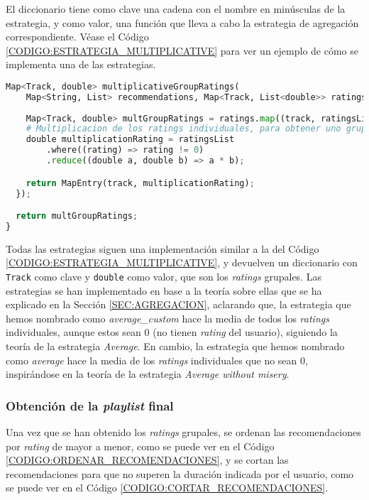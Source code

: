El diccionario tiene como clave una cadena con el nombre en minúsculas de la estrategia, y como valor, 
una función que lleva a cabo la estrategia de agregación correspondiente. Véase el Código \ref{CODIGO:ESTRATEGIA_MULTIPLICATIVE} 
para ver un ejemplo de cómo se implementa una de las estrategias.

\begin{lstlisting}[language=python, caption=Estrategia de agregación \textit{average}, label=CODIGO:ESTRATEGIA_MULTIPLICATIVE]
Map<Track, double> multiplicativeGroupRatings(
    Map<String, List> recommendations, Map<Track, List<double>> ratings) {
  
    Map<Track, double> multGroupRatings = ratings.map((track, ratingsList) {
    # Multiplicacion de los ratings individuales, para obtener uno grupal
    double multiplicationRating = ratingsList
        .where((rating) => rating != 0)
        .reduce((double a, double b) => a * b);

    return MapEntry(track, multiplicationRating);
  });

  return multGroupRatings;
}
\end{lstlisting}

Todas las estrategias siguen una implementación similar a la del Código \ref{CODIGO:ESTRATEGIA_MULTIPLICATIVE},
y devuelven un diccionario con \texttt{Track} como clave y \texttt{double} como valor, que son los \textit{ratings} grupales.
Las estrategias se han implementado en base a la teoría sobre ellas que se ha explicado en la Sección \ref{SEC:AGREGACION}, 
aclarando que, la estrategia que hemos nombrado como \textit{average\_custom} hace la media de todos los \textit{ratings} individuales,
aunque estos sean 0 (no tienen \textit{rating} del usuario), siguiendo la teoría de la estrategia \textit{Average}. En cambio, la estrategia que hemos 
nombrado como \textit{average} hace la media de los \textit{ratings} individuales que no sean 0, inspirándose en la teoría de la estrategia 
\textit{Average without misery}.

\subsubsection{Obtención de la \textit{playlist} final\label{subsec:playlist_final_implementacion}}

Una vez que se han obtenido los \textit{ratings} grupales, se ordenan las recomendaciones por \textit{rating} de mayor a menor, como 
se puede ver en el Código \ref{CODIGO:ORDENAR_RECOMENDACIONES}, y se cortan las recomendaciones para que no superen la duración 
indicada por el usuario, como se puede ver en el Código \ref{CODIGO:CORTAR_RECOMENDACIONES}.

